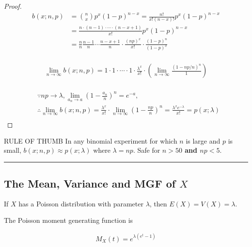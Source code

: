 \begin{proof}
    \begin{align*}
        b(x;n,p) & = \binom{n}{x} p^x (1-p)^{n-x} = \frac{n!}{x!(n-x)!} p^x (1-p)^{n-x} \\
        & = \frac{n\cdot (n-1) \cdot \cdots \cdot (n-x+1)}{x!} p^x (1-p)^{n-x}\\
        & = \frac{n}{n} \frac{n-1}{n}\cdots \frac{n-x+1}{n}\cdot\frac{(np)^x}{x!}\cdot\frac{(1-p)^n}{(1-p)^x} \\
    \end{align*}
    
    \begin{align*}
        \lim\limits_{n\rightarrow\infty}b(x;n,p) = 1\cdot 1 \cdot \cdots \cdot 1 \cdot \frac{\lambda^x}{x!}\cdot\left(\lim\limits_{n\rightarrow\infty}\frac{(1-np/n)^n}{1}\right) \\
    \end{align*}
    
    \begin{align*}
        & \because np\rightarrow\lambda, \lim\limits_{a_n\rightarrow a}\left(1-\frac{a_n}{n}\right)^n=e^{-a}, \\
        & \therefore \lim\limits_{n\rightarrow\infty}b(x;n,p) = \frac{\lambda^x}{x!}\cdot\lim\limits_{n\rightarrow\infty}\left(1-\frac{np}{n}\right)^n = \frac{\lambda^xe^{-\lambda}}{x!} = p(x;\lambda) \\
    \end{align*}
\end{proof}

\begin{theorem}{RULE OF THUMB}
    In any binomial experiment for which $n$ is large and $p$ is small, $b(x;n,p)\approx p(x;\lambda)$ where $\lambda = np$. Safe for \textbf{$n > 50$ and $np < 5$}.
\end{theorem}

\noindent\rule{\textwidth}{1pt}

\subsection{The Mean, Variance and MGF of $X$}

\begin{proposition}
    If $X$ has a Poisson distribution with parameter $\lambda$, then $E(X) = V(X) = \lambda$.
\end{proposition}

\begin{proposition}
    The Poisson moment generating function is 

    \begin{align*}
        M_X(t) = e^{\lambda(e^t-1)}
    \end{align*}
\end{proposition}

